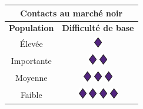 \documentclass{article}
\begin{document}
\begin{tabular}{|c|c|}
	\hline 
	\multicolumn{2}{|c|}{\cellcolor{DarkRed} \textbf{{\large \textcolor{PureWhite}{Contacts au marché noir}}}} \\ 
	\hline 
	\cellcolor{DarkGold}\textbf{Population} & \cellcolor{DarkGold}\textbf{Difficulté de base} \\ 
	\hline 
	Élevée & {\Large \includegraphics[height=\fontcharht\font`\B]{../img/dice_purple}} \\ 
	\hline 
	Importante & {\Large \includegraphics[height=\fontcharht\font`\B]{../img/dice_purple}} {\Large \includegraphics[height=\fontcharht\font`\B]{../img/dice_purple}} \\ 
	\hline 
	Moyenne & {\Large \includegraphics[height=\fontcharht\font`\B]{../img/dice_purple}} {\Large \includegraphics[height=\fontcharht\font`\B]{../img/dice_purple}} {\Large \includegraphics[height=\fontcharht\font`\B]{../img/dice_purple}} \\ 
	\hline 
	Faible & {\Large \includegraphics[height=\fontcharht\font`\B]{../img/dice_purple}} {\Large \includegraphics[height=\fontcharht\font`\B]{../img/dice_purple}} {\Large \includegraphics[height=\fontcharht\font`\B]{../img/dice_purple}} {\Large \includegraphics[height=\fontcharht\font`\B]{../img/dice_purple}} \\ 

\end{tabular}
\end{document}
